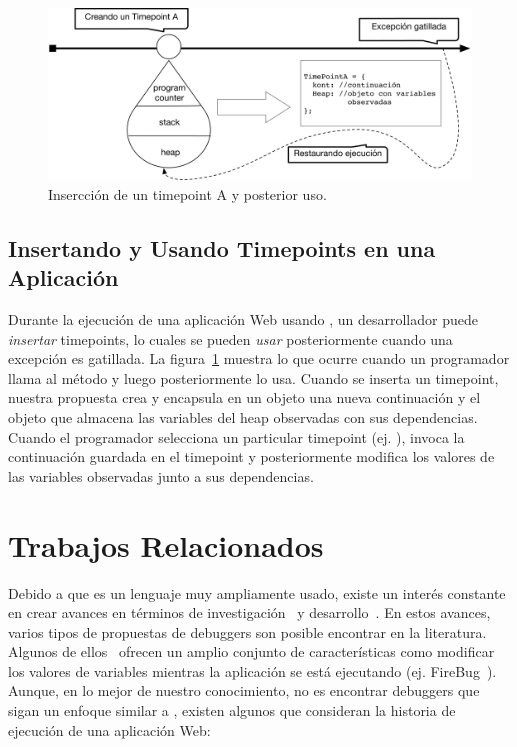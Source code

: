 \documentclass[conference]{IEEEtran}
\begin{document}
\begin{figure}[t]
\begin{center}
\includegraphics[width=.95\linewidth]{fig-timePointA}
\caption{Insercci\'on de un timepoint A y posterior uso.}
\label{fig:tpA}
\end{center}
\end{figure}


\subsection{Insertando y Usando Timepoints en una Aplicaci\'on}
\label{sec:utime}

Durante la ejecuci\'on de una aplicaci\'on Web usando \deloreanjs, un desarrollador puede {\em insertar} timepoints, lo cuales se pueden {\em usar} posteriormente cuando una excepci\'on es gatillada. La figura~\ref{fig:tpA} muestra lo que ocurre cuando un programador llama al m\'etodo  y luego posteriormente lo usa. Cuando se inserta un timepoint, nuestra propuesta crea y encapsula en un objeto  una nueva continuaci\'on y el objeto que almacena las variables del heap observadas con sus dependencias. Cuando el programador selecciona un particular timepoint (ej. ), \deloreanjs invoca la continuaci\'on guardada en el timepoint y posteriormente modifica los valores de las variables observadas junto a sus dependencias.   
 
\section{Trabajos Relacionados}
\label{sec:rw}

Debido a que \javascript es un lenguaje muy ampliamente usado, existe un inter\'es constante en crear avances en t\'erminos de investigaci\'on~\cite{vazquesAl:ist2018,legerAl:scp2013,legerAl:scp2015,zhengAl:www2011,chargueraudAl:www2018} y desarrollo~\cite{resig:jquery,angular,mckenzie:babel,rxjs}. En estos avances, varios tipos de propuestas de debuggers son posible encontrar en la literatura. Algunos de ellos~\cite{bartonOdvarko:www2011,jsbin,nodejsInspector} ofrecen un amplio conjunto de caracter\'isticas como modificar los valores de variables mientras la aplicaci\'on se est\'a ejecutando (ej. FireBug~\cite{bartonOdvarko:www2011}). Aunque, en lo mejor de nuestro conocimiento, no es encontrar debuggers que sigan un enfoque similar a \deloreanjs, existen algunos que consideran la historia de ejecuci\'on de una aplicaci\'on Web:       
\end{document}
